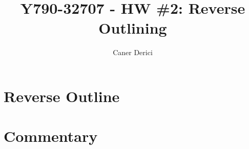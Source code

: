 \documentclass{article}
\title{Y790-32707 - HW \#2: Reverse Outlining}
\author{}
\date{Caner Derici}
\begin{document}

\maketitle



\section{Reverse Outline}


\section{Commentary}




\end{document}
